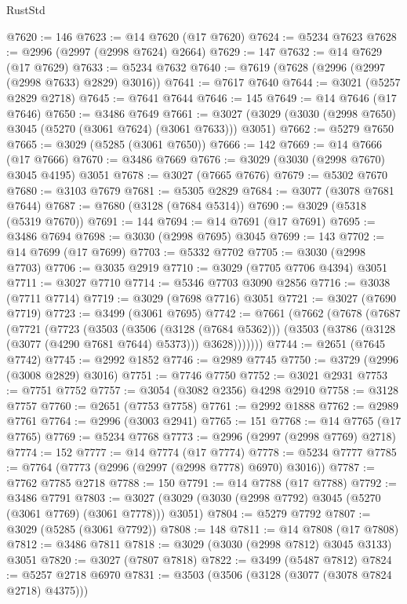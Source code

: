 \begin{lexlean}{RustStd}
\begin{coremodule}
@7620 := 146
@7623 := @14 @7620 (@17 @7620)
@7624 := @5234 @7623
@7628 := @2996 (@2997 (@2998 @7624) @2664)
@7629 := 147
@7632 := @14 @7629 (@17 @7629)
@7633 := @5234 @7632
@7640 := @7619 (@7628 (@2996 (@2997 (@2998 @7633) @2829) @3016))
@7641 := @7617 @7640
@7644 := @3021 (@5257 @2829 @2718)
@7645 := @7641 @7644
@7646 := 145
@7649 := @14 @7646 (@17 @7646)
@7650 := @3486 @7649
@7661 := @3027 (@3029 (@3030 (@2998 @7650) @3045 (@5270 (@3061 @7624) (@3061 @7633))) @3051)
@7662 := @5279 @7650
@7665 := @3029 (@5285 (@3061 @7650))
@7666 := 142
@7669 := @14 @7666 (@17 @7666)
@7670 := @3486 @7669
@7676 := @3029 (@3030 (@2998 @7670) @3045 @4195) @3051
@7678 := @3027 (@7665 @7676)
@7679 := @5302 @7670
@7680 := @3103 @7679
@7681 := @5305 @2829
@7684 := @3077 (@3078 @7681 @7644)
@7687 := @7680 (@3128 (@7684 @5314))
@7690 := @3029 (@5318 (@5319 @7670))
@7691 := 144
@7694 := @14 @7691 (@17 @7691)
@7695 := @3486 @7694
@7698 := @3030 (@2998 @7695) @3045
@7699 := 143
@7702 := @14 @7699 (@17 @7699)
@7703 := @5332 @7702
@7705 := @3030 (@2998 @7703)
@7706 := @3035 @2919
@7710 := @3029 (@7705 @7706 @4394) @3051
@7711 := @3027 @7710
@7714 := @5346 @7703 @3090 @2856
@7716 := @3038 (@7711 @7714)
@7719 := @3029 (@7698 @7716) @3051
@7721 := @3027 (@7690 @7719)
@7723 := @3499 (@3061 @7695)
@7742 := @7661
    (@7662
      (@7678
        (@7687
          (@7721
            (@7723
              (@3503
                (@3506 (@3128 (@7684 @5362)))
                (@3503 (@3786 (@3128 (@3077 (@4290 @7681 @7644) @5373))) @3628)))))))
@7744 := @2651 (@7645 @7742)
@7745 := @2992 @1852
@7746 := @2989 @7745
@7750 := @3729 (@2996 (@3008 @2829) @3016)
@7751 := @7746 @7750
@7752 := @3021 @2931
@7753 := @7751 @7752
@7757 := @3054 (@3082 @2356) @4298 @2910
@7758 := @3128 @7757
@7760 := @2651 (@7753 @7758)
@7761 := @2992 @1888
@7762 := @2989 @7761
@7764 := @2996 (@3003 @2941)
@7765 := 151
@7768 := @14 @7765 (@17 @7765)
@7769 := @5234 @7768
@7773 := @2996 (@2997 (@2998 @7769) @2718)
@7774 := 152
@7777 := @14 @7774 (@17 @7774)
@7778 := @5234 @7777
@7785 := @7764 (@7773 (@2996 (@2997 (@2998 @7778) @6970) @3016))
@7787 := @7762 @7785 @2718
@7788 := 150
@7791 := @14 @7788 (@17 @7788)
@7792 := @3486 @7791
@7803 := @3027 (@3029 (@3030 (@2998 @7792) @3045 (@5270 (@3061 @7769) (@3061 @7778))) @3051)
@7804 := @5279 @7792
@7807 := @3029 (@5285 (@3061 @7792))
@7808 := 148
@7811 := @14 @7808 (@17 @7808)
@7812 := @3486 @7811
@7818 := @3029 (@3030 (@2998 @7812) @3045 @3133) @3051
@7820 := @3027 (@7807 @7818)
@7822 := @3499 (@5487 @7812)
@7824 := @5257 @2718 @6970
@7831 := @3503 (@3506 (@3128 (@3077 (@3078 @7824 @2718) @4375)))

\end{coremodule}
\end{lexlean}
